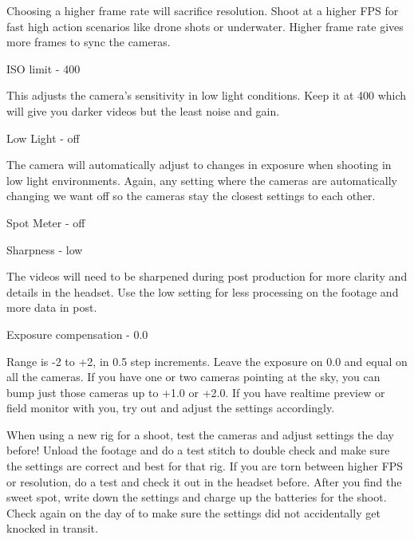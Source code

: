\begin{fullwidth}

Choosing a higher frame rate will sacrifice resolution. Shoot at a higher FPS for fast high action scenarios like drone shots or underwater. Higher frame rate gives more frames to sync the cameras.

{\large ISO limit - 400 \par}


This adjusts the camera’s sensitivity in low light conditions. Keep it at 400 which will give you darker videos but the least noise and gain. 

\clearpage
{\large Low Light - off \par}


The camera will automatically adjust to changes in exposure when shooting in low light environments. Again, any setting where the cameras are automatically changing we want off so the cameras stay the closest settings to each other. 

{\large Spot Meter - off \par}


\clearpage
{\large Sharpness - low \par}


The videos will need to be sharpened during post production for more clarity and details in the headset. Use the low setting for less processing on the footage and more data in post. 

{\large Exposure compensation - 0.0 \par} 


Range is -2 to +2, in 0.5 step increments. Leave the exposure on 0.0 and equal on all the cameras. If you have one or two cameras pointing at the sky, you can bump just those cameras up to +1.0 or +2.0. If you have realtime preview or field monitor with you, try out and adjust the settings accordingly. 

\tip When using a new rig for a shoot, test the cameras and adjust settings the day before! Unload the footage and do a test stitch to double check and make sure the settings are correct and best for that rig. If you are torn between higher FPS or resolution, do a test and check it out in the headset before. After you find the sweet spot, write down the settings and charge up the batteries for the shoot. Check again on the day of to make sure the settings did not accidentally get knocked in transit. 

\clearpage
\end{fullwidth}
